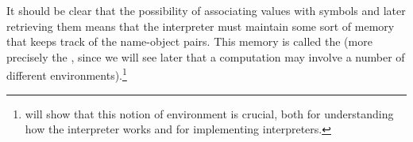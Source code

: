 It should be clear that the possibility of associating values with symbols and
later retrieving them means that the interpreter must maintain some sort of
memory that keeps track of the name-object pairs.  This memory is called the
 (more precisely the , since
we will see later that a computation may involve a number of different
environments).\footnote{ will show that this notion of
environment is crucial, both for understanding how the interpreter works and
for implementing interpreters.}


